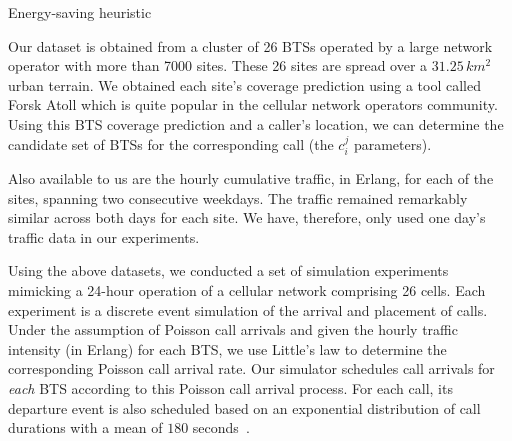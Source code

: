 \IncMargin{1em}
\LinesNumbered
\begin{algorithm}
\caption{Energy-saving heuristic}
\label{algo:heur1}
\end{algorithm}
\DecMargin{1em}

Our dataset is obtained from a cluster of 26 BTSs operated by a large network operator with more than 7000 sites. These 26 sites are spread over a $31.25$\,$km^2$ urban terrain. We obtained each site's coverage prediction using a tool called Forsk Atoll which is quite popular in the cellular network operators community. Using this BTS coverage prediction and a caller's location, we can determine the candidate set of BTSs for the corresponding call (the $c_i^j$ parameters). 

Also available to us are the hourly cumulative traffic, in Erlang, for each of the sites, spanning two consecutive weekdays. The traffic remained remarkably similar across both days for each site. We have, therefore, only used one day's traffic data in our experiments.

Using the above datasets, we conducted a set of simulation experiments mimicking a 24-hour operation of a cellular network comprising 26 cells.
Each experiment is a discrete event simulation of the arrival and placement of calls.
Under the assumption of Poisson call arrivals and given the hourly traffic intensity (in Erlang) for each BTS, we use Little's law to determine the corresponding Poisson call arrival rate.
Our simulator schedules call arrivals for \emph{each} BTS according to this Poisson call arrival process.
For each call, its departure event is also scheduled based on an exponential distribution of call durations with a mean of $180$ seconds~\cite{Gerla:1995:MMM:276418.276421}.

